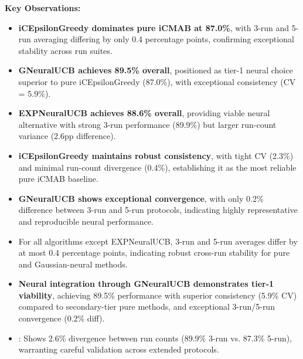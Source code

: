 \documentclass[12pt,a4paper]{article}
\newcommand{\performance}[1]{\textcolor{performancecolor}{\textbf{#1}}}
\newcommand{\legacy}[1]{\textcolor{legacycolor}{\textbf{#1}}}
\newcommand{\neural}[1]{\textcolor{neuralcolor}{\textbf{#1}}}
\begin{document}
\begin{tcolorbox}[colback=performancecolor!10,colframe=performancecolor,title=\textbf{Primary iCMAB Performance Results (Aggregated Across Capacities and Environments)}]
\textbf{Key Observations:}
\begin{itemize}
\item \performance{iCEpsilonGreedy dominates pure iCMAB at 87.0\%}, with 3-run and 5-run averaging differing by only 0.4 percentage points, confirming exceptional stability across run suites.
\item \neural{GNeuralUCB achieves 89.5\% overall}, positioned as tier-1 neural choice superior to pure iCEpsilonGreedy (87.0\%), with exceptional consistency (CV = 5.9\%).
\item \legacy{EXPNeuralUCB achieves 88.6\% overall}, providing viable neural alternative with strong 3-run performance (89.9\%) but larger run-count variance (2.6pp difference).
\item \performance{iCEpsilonGreedy maintains robust consistency}, with tight CV (2.3\%) and minimal run-count divergence (0.4\%), establishing it as the most reliable pure iCMAB baseline.
\item \neural{GNeuralUCB shows exceptional convergence}, with only 0.2\% difference between 3-run and 5-run protocols, indicating highly representative and reproducible neural performance.
\item For all algorithms except EXPNeuralUCB, 3-run and 5-run averages differ by at most 0.4 percentage points, indicating robust cross-run stability for pure and Gaussian-neural methods.
\item \neural{Neural integration through GNeuralUCB demonstrates tier-1 viability}, achieving 89.5\% performance with superior consistency (5.9\% CV) compared to secondary-tier pure methods, and exceptional 3-run/5-run convergence (0.2\% diff).
\item {}: Shows 2.6\% divergence between run counts (89.9\% 3-run vs. 87.3\% 5-run), warranting careful validation across extended protocols.
\end{itemize}

\end{tcolorbox}
\end{document}
